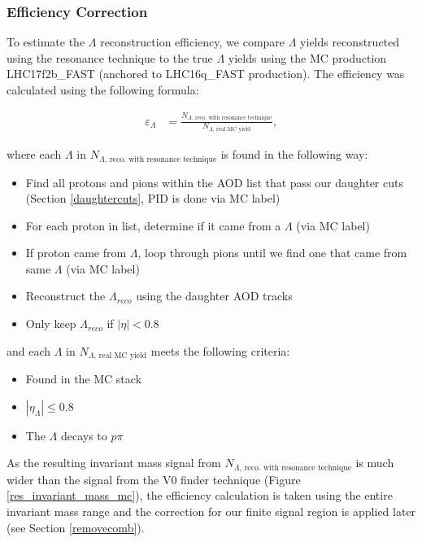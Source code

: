 \documentclass[ALICE,manyauthors]{ALICE_analysis_notes}
\begin{document}
\subsubsection{Efficiency Correction}
To estimate the $\Lambda$ reconstruction efficiency, we compare $\Lambda$ yields reconstructed using the resonance technique to the true $\Lambda$ yields using the MC production LHC17f2b\_FAST (anchored to LHC16q\_FAST production). The efficiency was calculated using the following formula:

\begin{align*}
	\varepsilon_{\Lambda} &=  \frac{N_{\Lambda\text{, reco. with resonance technique}}}{N_{\Lambda\text{, real MC yield}}},
\end{align*}

where each $\Lambda$ in $N_{\Lambda\text{, reco. with resonance technique}}$ is found in the following way:

\begin{itemize}
	\item Find all protons and pions within the AOD list that pass our daughter cuts (Section \ref{daughtercuts}, PID is done via MC label)
	\item For each proton in list, determine if it came from a $\Lambda$ (via MC label)
	\item If proton came from $\Lambda$, loop through pions until we find one that came from same $\Lambda$ (via MC label)
	\item Reconstruct the $\Lambda_{reco}$ using the daughter AOD tracks
	\item Only keep $\Lambda_{reco}$ if $|\eta| < 0.8$
\end{itemize}

and each $\Lambda$ in $N_{\Lambda\text{, real MC yield}}$ meets the following criteria:

\begin{itemize}
	\item Found in the MC stack
	\item $|\eta_{\Lambda}| \leq 0.8$
	\item The $\Lambda$ decays to $p\pi$
\end{itemize}

As the resulting invariant mass signal from $N_{\Lambda\text{, reco. with resonance technique}}$ is much wider than the signal from the V0 finder technique (Figure \ref{res_invariant_mass_mc}), the efficiency calculation is taken using the entire invariant mass range and the correction for our finite signal region is applied later (see Section \ref{removecomb}).
\end{document}
